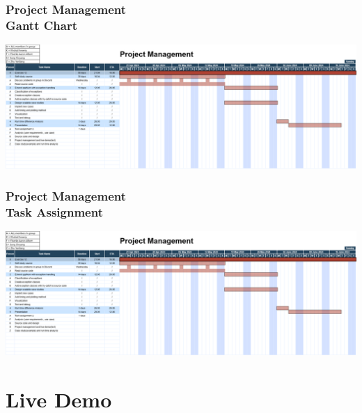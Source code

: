 \documentclass[ucs,10pt]{beamer}
\begin{document}
\begin{frame}
\frametitle{Project Management \\
	\small \color{rwth-blue} Gantt Chart}
	
	\begin{center}
		\includegraphics[width=\textwidth]{figures/project management.png}
	\end{center}
\end{frame}

\begin{frame}
\frametitle{Project Management \\
	\small \color{rwth-blue} Task Assignment}
	
	\begin{flushleft}
		\includegraphics[height=\textheight,keepaspectratio]{figures/project management.png}
	\end{flushleft}
\end{frame}
	
\section{Live Demo}
\end{document}

